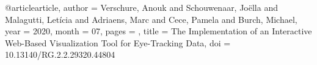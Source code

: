@article{article,
author = {Verschure, Anouk and Schouwenaar, Joëlla and Malagutti, Letícia and Adriaens, Marc and Cece, Pamela and Burch, Michael},
year = {2020},
month = {07},
pages = {},
title = {The Implementation of an Interactive Web-Based Visualization Tool for Eye-Tracking Data},
doi = {10.13140/RG.2.2.29320.44804}
}